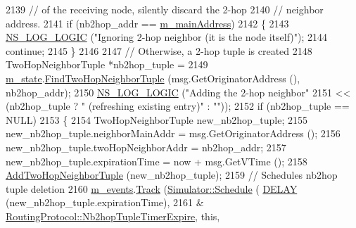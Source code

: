 \begin{DoxyCode}
2139                   \textcolor{comment}{// of the receiving node, silently discard the 2-hop}
2140                   \textcolor{comment}{// neighbor address.}
2141                   \textcolor{keywordflow}{if} (nb2hop\_addr == \hyperlink{classns3_1_1olsr_1_1RoutingProtocol_a58cc50ed5d1039aab603e90e318aabfb}{m\_mainAddress})
2142                     \{
2143                       \hyperlink{group__logging_ga88acd260151caf2db9c0fc84997f45ce}{NS\_LOG\_LOGIC} (\textcolor{stringliteral}{"Ignoring 2-hop neighbor (it is the node itself)"});
2144                       \textcolor{keywordflow}{continue};
2145                     \}
2146 
2147                   \textcolor{comment}{// Otherwise, a 2-hop tuple is created}
2148                   TwoHopNeighborTuple *nb2hop\_tuple =
2149                     \hyperlink{classns3_1_1olsr_1_1RoutingProtocol_a07942ec1a7df71b609c8d2ff3b567c49}{m\_state}.\hyperlink{classns3_1_1olsr_1_1OlsrState_a420ef02aeb9997bff09bbebd6a72e642}{FindTwoHopNeighborTuple} (msg.GetOriginatorAddress
       (), nb2hop\_addr);
2150                   \hyperlink{group__logging_ga88acd260151caf2db9c0fc84997f45ce}{NS\_LOG\_LOGIC} (\textcolor{stringliteral}{"Adding the 2-hop neighbor"}
2151                                 << (nb2hop\_tuple ? \textcolor{stringliteral}{" (refreshing existing entry)"} : \textcolor{stringliteral}{""}));
2152                   \textcolor{keywordflow}{if} (nb2hop\_tuple == NULL)
2153                     \{
2154                       TwoHopNeighborTuple new\_nb2hop\_tuple;
2155                       new\_nb2hop\_tuple.neighborMainAddr = msg.GetOriginatorAddress ();
2156                       new\_nb2hop\_tuple.twoHopNeighborAddr = nb2hop\_addr;
2157                       new\_nb2hop\_tuple.expirationTime = now + msg.GetVTime ();
2158                       \hyperlink{classns3_1_1olsr_1_1RoutingProtocol_a0ba9661c0d7b61bb0785f3c10af566d5}{AddTwoHopNeighborTuple} (new\_nb2hop\_tuple);
2159                       \textcolor{comment}{// Schedules nb2hop tuple deletion}
2160                       \hyperlink{classns3_1_1olsr_1_1RoutingProtocol_a80368d3da46150cf3fc9139c40f33d53}{m\_events}.\hyperlink{classns3_1_1EventGarbageCollector_a4f26a1f6e9a09e648eb31b46acd85144}{Track} (\hyperlink{classns3_1_1Simulator_a671882c894a08af4a5e91181bf1eec13}{Simulator::Schedule} (
      \hyperlink{olsr-routing-protocol_8cc_ad0a00c3386c4a24278b3b710ae798220}{DELAY} (new\_nb2hop\_tuple.expirationTime),
2161                                                            &
      \hyperlink{classns3_1_1olsr_1_1RoutingProtocol_a5e71d702e1b560c4645139912da27002}{RoutingProtocol::Nb2hopTupleTimerExpire}, \textcolor{keyword}{this},

\end{DoxyCode}
